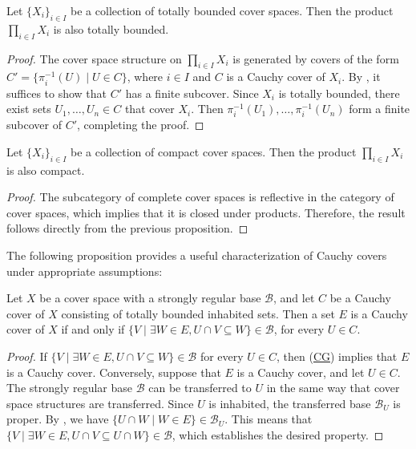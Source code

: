 \documentclass[pdflatex,sn-mathphys-num]{sn-jnl}
\newcommand{\axref}[1]{(\hyperref[ax:#1]{#1})}
\theoremstyle{definition}
\theoremstyle{remark}
\numberwithin{figure}{section}
\begin{document}
\begin{prop}
Let $\{ X_i \}_{i \in I}$ be a collection of totally bounded cover spaces.
Then the product $\prod_{i \in I} X_i$ is also totally bounded.
\end{prop}
\begin{proof}
The cover space structure on $\prod_{i \in I} X_i$ is generated by covers of the form $C' = \{ \pi_i^{-1}(U) \mid U \in C \}$, where  $i \in I$ and $C$ is a Cauchy cover of $X_i$.
By , it suffices to show that $C'$ has a finite subcover.
Since $X_i$ is totally bounded, there exist sets $U_1, \ldots, U_n \in C$ that cover $X_i$.
Then $\pi_i^{-1}(U_1), \ldots, \pi_i^{-1}(U_n)$ form a finite subcover of $C'$, completing the proof.
\end{proof}

\begin{cor}
Let $\{ X_i \}_{i \in I}$ be a collection of compact cover spaces.
Then the product $\prod_{i \in I} X_i$ is also compact.
\end{cor}
\begin{proof}
The subcategory of complete cover spaces is reflective in the category of cover spaces, which implies that it is closed under products.
Therefore, the result follows directly from the previous proposition.
\end{proof}

The following proposition provides a useful characterization of Cauchy covers under appropriate assumptions:

\begin{prop}
Let $X$ be a cover space with a strongly regular base $\mathcal{B}$, and let $C$ be a Cauchy cover of $X$ consisting of totally bounded inhabited sets.
Then a set $E$ is a Cauchy cover of $X$ if and only if $\{ V \mid \exists W \in E, U \cap V \subseteq W \} \in \mathcal{B}$, for every $U \in C$.
\end{prop}
\begin{proof}
If $\{ V \mid \exists W \in E, U \cap V \subseteq W \} \in \mathcal{B}$ for every $U \in C$, then \axref{CG} implies that $E$ is a Cauchy cover.
Conversely, suppose that $E$ is a Cauchy cover, and let $U \in C$.
The strongly regular base $\mathcal{B}$ can be transferred to $U$ in the same way that cover space structures are transferred.
Since $U$ is inhabited, the transferred base $\mathcal{B}_U$ is proper.
By , we have $\{ U \cap W \mid W \in E \} \in \mathcal{B}_U$.
This means that $\{ V \mid \exists W \in E, U \cap V \subseteq U \cap W \} \in \mathcal{B}$, which establishes the desired property.
\end{proof}
\end{document}
